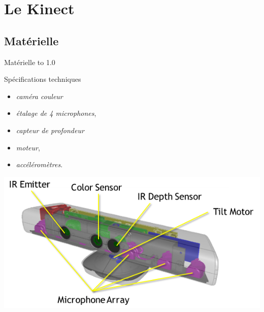 \section{Le Kinect}

\begin{frame}
\end{frame}

\subsection{Matérielle}
\begin{frame}{Matérielle}
\vbox to 1.0\textheight
{
\begin{block}{Spécifications techniques~\cite{kinect_msdn}\cite{wiki_kinect}}
  \begin{minipage}[t]{0.49\linewidth}
    \begin{itemize}
    \item<1-> \emph{caméra couleur}
    \item<2-> \emph{étalage de 4 microphones},
    \end{itemize}
  \end{minipage} 
  \begin{minipage}[t]{0.49\linewidth}
    \begin{itemize}
    \item<3-> \emph{capteur de profondeur}
    \item<4-> \emph{moteur},
    \item<4-> \emph{accéléromètres}.
    \end{itemize}
  \end{minipage}
\end{block}
  \begin{center}
    \includegraphics[height=0.4\textheight]{../images/kinect_specs}
  \end{center}
  \vfill
}
\end{frame}

